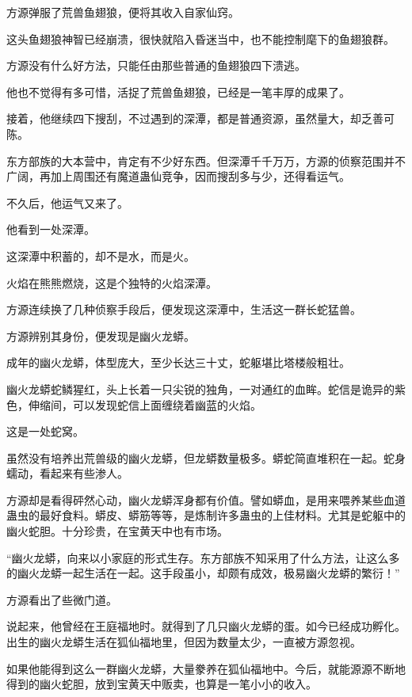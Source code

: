 
\begin{this_body}

方源弹服了荒兽鱼翅狼，便将其收入自家仙窍。

这头鱼翅狼神智已经崩溃，很快就陷入昏迷当中，也不能控制麾下的鱼翅狼群。

方源没有什么好方法，只能任由那些普通的鱼翅狼四下溃逃。

他也不觉得有多可惜，活捉了荒兽鱼翅狼，已经是一笔丰厚的成果了。

接着，他继续四下搜刮，不过遇到的深潭，都是普通资源，虽然量大，却乏善可陈。

东方部族的大本营中，肯定有不少好东西。但深潭千千万万，方源的侦察范围并不广阔，再加上周围还有魔道蛊仙竞争，因而搜刮多与少，还得看运气。

不久后，他运气又来了。

他看到一处深潭。

这深潭中积蓄的，却不是水，而是火。

火焰在熊熊燃烧，这是个独特的火焰深潭。

方源连续换了几种侦察手段后，便发现这深潭中，生活这一群长蛇猛兽。

方源辨别其身份，便发现是幽火龙蟒。

成年的幽火龙蟒，体型庞大，至少长达三十丈，蛇躯堪比塔楼般粗壮。

幽火龙蟒蛇鳞猩红，头上长着一只尖锐的独角，一对通红的血眸。蛇信是诡异的紫色，伸缩间，可以发现蛇信上面缠绕着幽蓝的火焰。

这是一处蛇窝。

虽然没有培养出荒兽级的幽火龙蟒，但龙蟒数量极多。蟒蛇简直堆积在一起。蛇身蠕动，看起来有些渗人。

方源却是看得砰然心动，幽火龙蟒浑身都有价值。譬如蟒血，是用来喂养某些血道蛊虫的最好食料。蟒皮、蟒筋等等，是炼制许多蛊虫的上佳材料。尤其是蛇躯中的幽火蛇胆。十分珍贵，在宝黄天中也有市场。

“幽火龙蟒，向来以小家庭的形式生存。东方部族不知采用了什么方法，让这么多的幽火龙蟒一起生活在一起。这手段虽小，却颇有成效，极易幽火龙蟒的繁衍！”

方源看出了些微门道。

说起来，他曾经在王庭福地时。就得到了几只幽火龙蟒的蛋。如今已经成功孵化。出生的幽火龙蟒生活在狐仙福地里，但因为数量太少，一直被方源忽视。

如果他能得到这么一群幽火龙蟒，大量豢养在狐仙福地中。今后，就能源源不断地得到的幽火蛇胆，放到宝黄天中贩卖，也算是一笔小小的收入。


\end{this_body}
